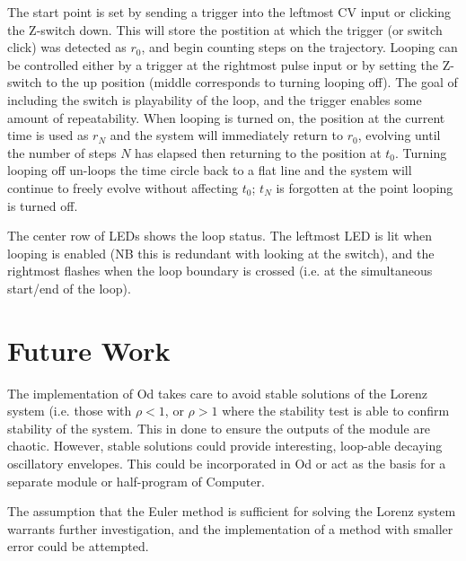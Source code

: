 \documentclass{tufte-handout}
\begin{document}
The start point is set by sending a trigger into the leftmost CV input or clicking the Z-switch down. This will store the postition at which the trigger (or switch click) was detected as $r_0$, and begin counting steps on the trajectory. Looping can be controlled either by a trigger at the rightmost pulse input or by setting the Z-switch to the up position (middle corresponds to turning looping off). The goal of including the switch is playability of the loop, and the trigger enables some amount of repeatability. When looping is turned on, the position at the current time is used as $r_N$ and the system will immediately return to $r_0$, evolving until the number of steps $N$ has elapsed then returning to the position at $t_0$. Turning looping off un-loops the time circle back to a flat line and the system will continue to freely evolve without affecting $t_0$; $t_N$ is forgotten at the point looping is turned off.

The center row of LEDs shows the loop status. The leftmost LED is lit when looping is enabled (NB this is redundant with looking at the switch), and the rightmost flashes when the loop boundary is crossed (i.e. at the simultaneous start/end of the loop).


\section{Future Work}\label{sec:future_work}

The implementation of Od takes care to avoid stable solutions of the Lorenz system (i.e. those with $\rho < 1$, or $\rho > 1$ where the stability test is able to confirm stability of the system. This in done to ensure the outputs of the module are chaotic. However, stable solutions could provide interesting, loop-able decaying oscillatory envelopes. This could be incorporated in Od or act as the basis for a separate module or half-program of Computer.

The assumption that the Euler method is sufficient for solving the Lorenz system warrants further investigation, and the implementation of a method with smaller error could be attempted.




\end{document}
